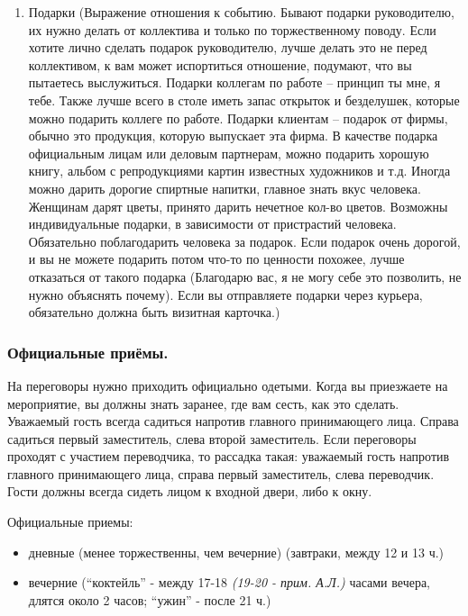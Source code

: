 \begin{enumerate}
\item Подарки (Выражение отношения к событию. Бывают подарки руководителю, их нужно делать от коллектива и только по торжественному поводу. Если хотите лично сделать подарок руководителю, лучше делать это не перед коллективом, к вам может испортиться отношение, подумают, что вы пытаетесь выслужиться. Подарки коллегам по работе – принцип ты мне, я тебе. Также лучше всего в столе иметь запас открыток и безделушек, которые можно подарить коллеге по работе. Подарки клиентам – подарок от фирмы, обычно это продукция, которую выпускает эта фирма. В качестве подарка официальным лицам или деловым партнерам, можно подарить хорошую книгу, альбом с репродукциями картин известных художников и т.д. Иногда можно дарить дорогие спиртные напитки, главное знать вкус человека. Женщинам дарят цветы, принято дарить нечетное кол-во цветов. Возможны индивидуальные подарки, в зависимости от пристрастий человека. Обязательно поблагодарить человека за подарок. Если подарок очень дорогой, и вы не можете подарить потом что-то по ценности похожее, лучше отказаться от такого подарка (Благодарю вас, я не могу себе это позволить, не нужно объяснять почему). Если вы отправляете подарки через курьера, обязательно должна быть визитная карточка.)
\end{enumerate}

\subsubsection{Официальные приёмы.}

На переговоры нужно приходить официально одетыми.
Когда вы приезжаете на мероприятие, вы должны знать заранее, где вам сесть, как это сделать. Уважаемый гость всегда садиться напротив главного принимающего лица. Справа садиться первый заместитель, слева второй заместитель. Если переговоры проходят с участием переводчика, то рассадка такая: уважаемый гость напротив главного принимающего лица, справа первый заместитель, слева переводчик. Гости должны всегда сидеть лицом к входной двери, либо к окну.

Официальные приемы:
\begin{itemize}
\item дневные (менее торжественны, чем вечерние) (завтраки, между 12 и 13 ч.)
\item вечерние (``коктейль'' - между 17-18 \textit{(19-20 - прим. А.Л.)} часами вечера, длятся около 2 часов; ``ужин'' - после 21 ч.)
\end{itemize}

